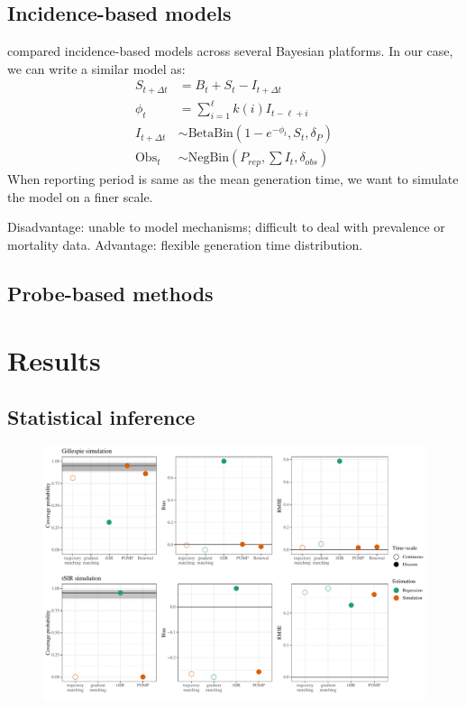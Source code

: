 \documentclass{article}
\begin{document}
\subsection{Incidence-based models}

\cite{li2018fitting} compared incidence-based models across several Bayesian platforms.
In our case, we can write a similar model as:
\begin{equation}
\begin{aligned}
S_{t + \Delta t} &= B_t + S_t - I_{t+\Delta t}\\
\phi_t &= \sum_{i=1}^\ell k(i) I_{t - \ell +i}\\
I_{t + \Delta t} &\sim \mathrm{BetaBin}(1- e^{-\phi_t}, S_t,\delta_P)\\
\mathrm{Obs}_t &\sim \mathrm{NegBin}(P_{rep}, \sum I_t, \delta_{obs})
\end{aligned}
\end{equation}
When reporting period is same as the mean generation time, we want to simulate the model on a finer scale.

Disadvantage: unable to model mechanisms; difficult to deal with prevalence or mortality data.
Advantage: flexible generation time distribution.



\subsection{Probe-based methods}

\section{Results}

\subsection{Statistical inference}

\begin{figure}[t]
\includegraphics[width=\textwidth]{../figure/compare_estimate_sir.pdf}
\end{figure}
\end{document}
